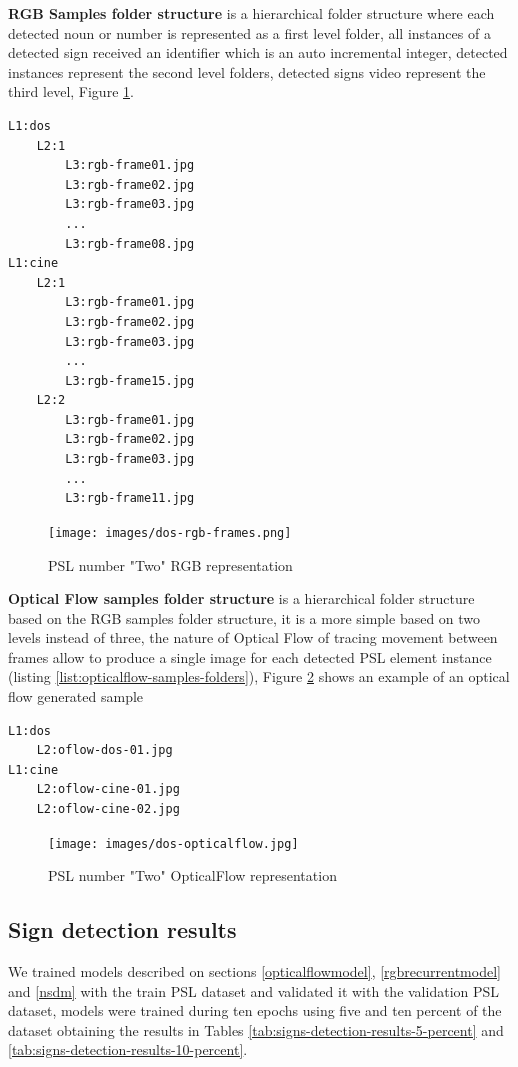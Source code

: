 \documentclass[twocolumn,conference]{article}
\begin{document}
\textbf{RGB Samples folder structure} is a hierarchical folder structure where each detected noun or number is represented as a first level folder, all instances of a detected sign received an identifier which is an auto incremental integer, detected instances represent the second level folders, detected signs video represent the third level, Figure \ref{fig:rgb-two}.
\begin{lstlisting}[caption=RGB Samples Folder Structure example, basicstyle=\ttfamily\small]
L1:dos
	L2:1
		L3:rgb-frame01.jpg
		L3:rgb-frame02.jpg
		L3:rgb-frame03.jpg
		...
		L3:rgb-frame08.jpg
L1:cine
	L2:1
		L3:rgb-frame01.jpg
		L3:rgb-frame02.jpg
		L3:rgb-frame03.jpg
		...
		L3:rgb-frame15.jpg
	L2:2
		L3:rgb-frame01.jpg
		L3:rgb-frame02.jpg
		L3:rgb-frame03.jpg
		...
		L3:rgb-frame11.jpg
\end{lstlisting}\label{list:rgb-samples-folders}

\begin{figure}[hbt!]
\texttt{[image: images/dos-rgb-frames.png]}
\caption{PSL number "Two" RGB representation}
\label{fig:rgb-two}
\end{figure}

\textbf{Optical Flow samples folder structure} is a hierarchical folder structure based on the RGB samples folder structure, it is a more simple based on two levels instead of three, the nature of Optical Flow of tracing movement between frames allow to produce a single image for each detected PSL element instance (listing \ref{list:opticalflow-samples-folders}), Figure \ref{fig:opticalflow-two} shows an example of an optical flow generated sample
\begin{lstlisting}[caption=Optical Flow Samples Folder Structure example, basicstyle=\ttfamily\small]
L1:dos
	L2:oflow-dos-01.jpg
L1:cine
	L2:oflow-cine-01.jpg
	L2:oflow-cine-02.jpg
\end{lstlisting}\label{list:opticalflow-samples-folders}
\begin{figure}[hbt!]
\texttt{[image: images/dos-opticalflow.jpg]}
\caption{PSL number "Two" OpticalFlow representation}
\label{fig:opticalflow-two}
\end{figure}

\subsection{Sign detection results}
We trained models described on sections \ref{opticalflowmodel}, \ref{rgbrecurrentmodel} and \ref{nsdm} with the train PSL dataset and validated it with the validation PSL dataset, models were trained during ten epochs using five and ten percent of the dataset obtaining the results in Tables \ref{tab:signs-detection-results-5-percent} and \ref{tab:signs-detection-results-10-percent}.
\end{document}
